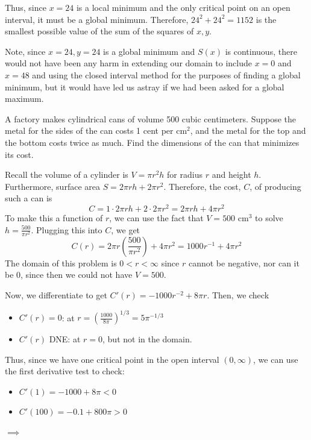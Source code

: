 \documentclass[11pt]{exam}
\begin{document}
\begin{questions}
\begin{solution}
  Thus, since \(x=24\) is a local minimum and the only critical point
  on an open interval, it must be a global minimum. Therefore,
  \(24^2+24^2 = 1152\) is the smallest possible value of the sum of
  the squares of \(x,y\).

  Note, since \(x=24, y=24\) is a global minimum and \(S(x)\) is
  continuous, there would not have been any harm in extending our
  domain to include \(x=0\) and \(x=48\) and using the closed interval
  method for the purposes of finding a global minimum, but it would
  have led us astray if we had been asked for a global maximum.
  \end{solution}
  \vspace{0.4in}
\question  A factory makes cylindrical cans of volume 500 cubic centimeters.  Suppose the metal for the sides of the can costs 1 cent per cm$^2$, and the metal for the top and the bottom costs twice as much.  Find the dimensions of the can that minimizes its cost.
  \begin{solution}
    Recall the volume of a cylinder is \(V = \pi r^2 h\) for radius
    \(r\) and height \(h\). Furthermore, surface area \(S = 2\pi r h +
    2 \pi r^2\).  Therefore, the cost, \(C\), of producing such a can is \[
      C = 1 \cdot 2 \pi r h + 2 \cdot 2 \pi r^2 = 2 \pi r h + 4 \pi r^2
    \]
    To make this a function of \(r\), we can use the fact that \(V =
    500\) cm\({}^3\) to solve \(h = \frac{500}{\pi r^2}\). Plugging
    this into \(C\), we get \[
      C(r) = 2 \pi r \left( \frac{500}{\pi r^2} \right) + 4 \pi r^2 =
      1000 r^{-1} + 4 \pi r^2
    \]
    The domain of this problem is \(0 < r < \infty\) since \(r\)
    cannot be negative, nor can it be \(0\), since then we could not
    have \(V = 500\).

    Now, we differentiate to get \(C'(r) = -1000r^{-2} + 8\pi
    r\). Then, we check 
    \begin{itemize}
    \item \(C'(r) = 0\): at \(r = \left(\frac{1000}{8\pi}\right)^{1/3} =
      5 \pi^{-1/3}\)
    \item \(C'(r)\) DNE: at \(r = 0\), but not in the domain.
    \end{itemize}
    Thus, since we have one critical point in the open interval
    \((0,\infty)\), we can use the first derivative test to check:
    \begin{itemize}
    \item \(C'(1) = -1000+8\pi < 0\)
    \item \(C'(100) = -0.1+800\pi > 0\)
    \end{itemize}
    \(\implies\)


\end{solution}
\end{questions}
\end{document}
